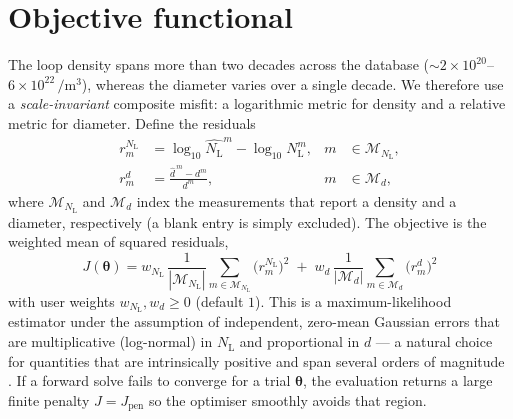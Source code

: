 \documentclass[11pt]{article}
\newcommand{\param}{\bm{\theta}}
\newcommand{\NL}{N_{\mathrm{L}}}
\begin{document}
\section{Objective functional}\label{sec:objective}
The loop density spans more than two decades across the database
(\(\sim\!2\times10^{20}\)–\(6\times10^{22}\,\si{\per\cubic\metre}\)), whereas the
diameter varies over a single decade. We therefore use a \emph{scale-invariant}
composite misfit: a logarithmic metric for density and a relative metric for
diameter. Define the residuals
\begin{align}
  r^{\NL}_m &= \log_{10}\widehat{\NL}^{m}-\log_{10}\NL^{m},
  & m&\in\mathcal{M}_{\NL}, \\
  r^{d}_m   &= \frac{\widehat{d}^{\,m}-d^{m}}{d^{m}},
  & m&\in\mathcal{M}_{d},
\end{align}
where $\mathcal{M}_{\NL}$ and $\mathcal{M}_{d}$ index the measurements that report
a density and a diameter, respectively (a blank entry is simply excluded). The
objective is the weighted mean of squared residuals,
\begin{equation}
  \boxed{\;
  J(\param)=
  w_{\NL}\,\frac{1}{|\mathcal{M}_{\NL}|}\!\sum_{m\in\mathcal{M}_{\NL}}\!\big(r^{\NL}_m\big)^2
  \;+\;
  w_{d}\,\frac{1}{|\mathcal{M}_{d}|}\!\sum_{m\in\mathcal{M}_{d}}\!\big(r^{d}_m\big)^2
  \;}
  \label{eq:objective}
\end{equation}
with user weights $w_{\NL},w_{d}\ge 0$ (default $1$). This is a maximum-likelihood
estimator under the assumption of independent, zero-mean Gaussian errors that are
multiplicative (log-normal) in $\NL$ and proportional in $d$ --- a natural choice
for quantities that are intrinsically positive and span several orders of
magnitude \citep{Tarantola2005}. If a forward solve fails to converge for a trial
$\param$, the evaluation returns a large finite penalty $J=J_{\mathrm{pen}}$ so the
optimiser smoothly avoids that region.

\end{document}

